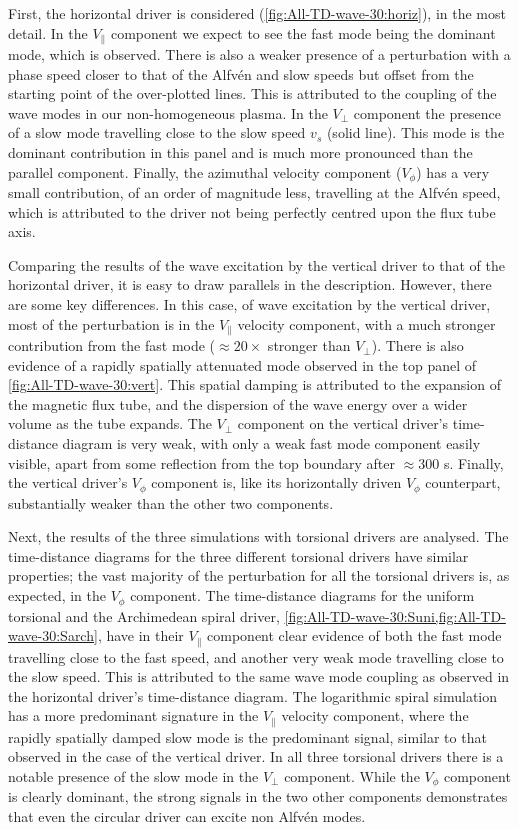 \documentclass[a4paper,12pt,fourier,authoryear,custommargin]{Classes/PhDThesisPSnPDF}
\begin{document}
First, the horizontal driver is considered (\cref{fig:All-TD-wave-30:horiz}), in the most detail. 
In the $V_\parallel$ component we expect to see the fast mode being the dominant mode, which is observed.
There is also a weaker presence of a perturbation with a phase speed closer to that of the Alfv\'en and slow speeds but offset from the starting point of the over-plotted lines.
This is attributed to the coupling of the wave modes in our non-homogeneous plasma.
In the $V_\perp$ component the presence of a slow mode travelling close to the slow speed $v_s$ (solid line).
This mode is the dominant contribution in this panel and is much more pronounced than the parallel component. 
Finally, the azimuthal velocity component ($V_\phi$) has a very small contribution, of an order of magnitude less, travelling at the Alfv\'en speed, which is attributed to the driver not being perfectly centred upon the flux tube axis.

Comparing the results of the wave excitation by the vertical driver to that of the horizontal driver, it is easy to draw parallels in the description.
However, there are some key differences. 
In this case, of wave excitation by the vertical driver, most of the perturbation is in the $V_\parallel$ velocity component, with a much stronger contribution from the fast mode ($\approx 20 \times$ stronger than $V_\perp$).
There is also evidence of a rapidly spatially attenuated mode observed in the top panel of \cref{fig:All-TD-wave-30:vert}.
This spatial damping is attributed to the expansion of the magnetic flux tube, and the dispersion of the wave energy over a wider volume as the tube expands.
The $V_\perp$ component on the vertical driver's time-distance diagram is very weak, with only a weak fast mode component easily visible, apart from some reflection from the top boundary after $\approx300$ s. 
Finally, the vertical driver's $V_\phi$ component is, like its horizontally driven $V_\phi$ counterpart, substantially weaker than the other two components.

Next, the results of the three simulations with torsional drivers are analysed.
The time-distance diagrams for the three different torsional drivers have similar properties; the vast majority of the perturbation for all the torsional drivers is, as expected, in the $V_\phi$ component.
The time-distance diagrams for the uniform torsional and the Archimedean spiral driver, \cref{fig:All-TD-wave-30:Suni,fig:All-TD-wave-30:Sarch}, have in their $V_\parallel$ component clear evidence of both the fast mode travelling close to the fast speed, and another very weak mode travelling close to the slow speed.
This is attributed to the same wave mode coupling as observed in the horizontal driver's time-distance diagram. 
The logarithmic spiral simulation has a more predominant signature in the $V_\parallel$ velocity component, where the rapidly spatially damped slow mode is the predominant signal, similar to that observed in the case of the vertical driver. 
In all three torsional drivers there is a notable presence of the slow mode in the $V_\perp$ component.
While the $V_\phi$ component is clearly dominant, the strong signals in the two other components demonstrates that even the circular driver can excite non Alfv\'en modes.
\end{document}
